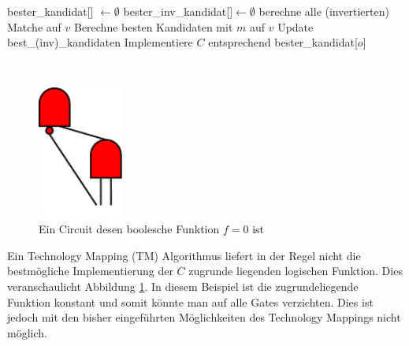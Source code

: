 \documentclass[11pt, a4paper, german]{article}
\newcommand{\TM}{Technology  Mapping }
\begin{document}
\begin{algorithm}[H]
 \LinesNumbered
 \DontPrintSemicolon
 \caption{(einfaches) Technology Mapping}

 bester\_kandidat[] $\gets \emptyset$\;
 bester\_inv\_kandidat[]$ \gets \emptyset$\;
 {
   berechne alle (invertierten) Matche auf $v$\;
   {
      Berechne besten Kandidaten mit $m$ auf $v$\;
      Update best\_(inv)\_kandidaten\;
   }
 }
 Implementiere $C$ entsprechend bester\_kandidat[$o$]\;
\end{algorithm}\ \\

\begin{figure}
		\includegraphics[width = 2.8cm]{pictures/compiled/compl_redundant}
		\caption{Ein Circuit desen boolesche Funktion $f = 0 $ ist}
		\label{bild:compl_redundant}
\end{figure}
Ein \TM (TM) Algorithmus liefert in der Regel nicht die bestmögliche Implementierung der $C$ zugrunde liegenden logischen Funktion. Dies veranschaulicht Abbildung \ref{bild:compl_redundant}. In diesem Beispiel ist die zugrundeliegende Funktion konstant und somit könnte man auf alle Gates verzichten. Dies ist jedoch mit den bisher eingeführten Möglichkeiten des Technology Mappings nicht möglich. \\
\end{document}
